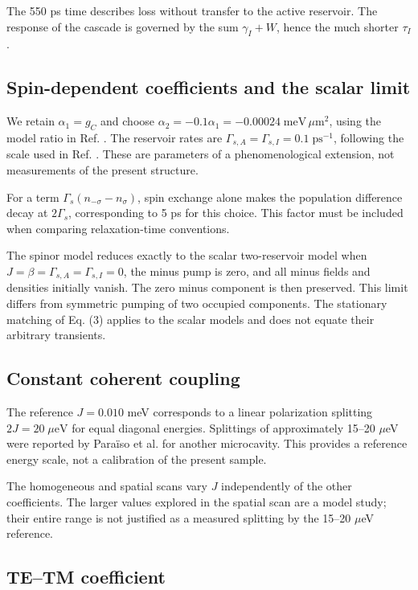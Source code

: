 \documentclass[12pt,a4paper]{article}
\begin{document}
The 550 ps time describes loss without transfer to the active reservoir. The response of the cascade is governed by the sum \(\gamma_I+W\), hence the much shorter \(\tau_I\).

\subsection{Spin-dependent coefficients and the scalar limit}

We retain \(\alpha_1=g_C\) and choose \(\alpha_2=-0.1\alpha_1=-0.00024\;\mathrm{meV}\,\mu\mathrm m^2\), using the model ratio in Ref. \cite{ref4}. The reservoir rates are \(\Gamma_{s,A}=\Gamma_{s,I}=0.1\;\mathrm{ps}^{-1}\), following the scale used in Ref. \cite{ref3}. These are parameters of a phenomenological extension, not measurements of the present structure.

For a term \(\Gamma_s(n_{-\sigma}-n_\sigma)\), spin exchange alone makes the population difference decay at \(2\Gamma_s\), corresponding to 5 ps for this choice. This factor must be included when comparing relaxation-time conventions.

The spinor model reduces exactly to the scalar two-reservoir model when \(J=\beta=\Gamma_{s,A}=\Gamma_{s,I}=0\), the minus pump is zero, and all minus fields and densities initially vanish. The zero minus component is then preserved. This limit differs from symmetric pumping of two occupied components. The stationary matching of Eq. (3) applies to the scalar models and does not equate their arbitrary transients.

\subsection{Constant coherent coupling}

The reference \(J=0.010\) meV corresponds to a linear polarization splitting \(2J=20\;\mu\mathrm{eV}\) for equal diagonal energies. Splittings of approximately 15--20 \ensuremath{\mu}eV were reported by Paraïso et al. \cite{ref5} for another microcavity. This provides a reference energy scale, not a calibration of the present sample.

The homogeneous and spatial scans vary \(J\) independently of the other coefficients. The larger values explored in the spatial scan are a model study; their entire range is not justified as a measured splitting by the 15--20 \ensuremath{\mu}eV reference.

\subsection{TE--TM coefficient}
\end{document}
